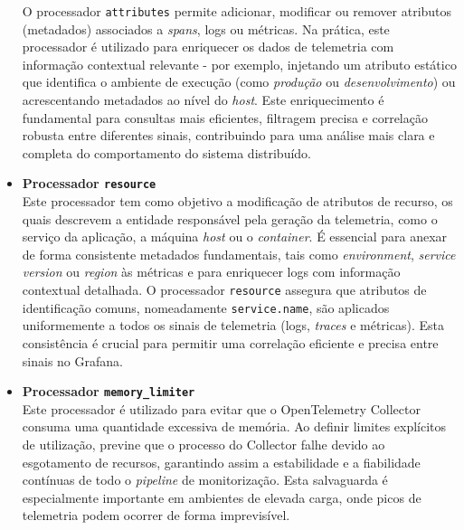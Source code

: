 \begin{itemize}
O processador \texttt{attributes} permite adicionar, modificar ou remover atributos (metadados) associados a \textit{spans}, logs ou métricas. Na prática, este processador é utilizado para enriquecer os dados de telemetria com informação contextual relevante - por exemplo, injetando um atributo estático que identifica o ambiente de execução (como \textit{produção} ou \textit{desenvolvimento}) ou acrescentando metadados ao nível do \textit{host}. Este enriquecimento é fundamental para consultas mais eficientes, filtragem precisa e correlação robusta entre diferentes sinais, contribuindo para uma análise mais clara e completa do comportamento do sistema distribuído.

\item \textbf{Processador \texttt{resource}}\\


Este processador tem como objetivo a modificação de atributos de recurso, os quais descrevem a entidade responsável pela geração da telemetria, como o serviço da aplicação, a máquina \textit{host} ou o \textit{container}. É essencial para anexar de forma consistente metadados fundamentais, tais como \textit{environment}, \textit{service version} ou \textit{region} às métricas e para enriquecer logs com informação contextual detalhada. O processador \texttt{resource} assegura que atributos de identificação comuns, nomeadamente \texttt{service.name}, são aplicados uniformemente a todos os sinais de telemetria (logs, \textit{traces} e métricas). Esta consistência é crucial para permitir uma correlação eficiente e precisa entre sinais no Grafana.

\item \textbf{Processador \texttt{memory\_limiter}}\\

Este processador é utilizado para evitar que o OpenTelemetry Collector consuma uma quantidade excessiva de memória. Ao definir limites explícitos de utilização, previne que o processo do Collector falhe devido ao esgotamento de recursos, garantindo assim a estabilidade e a fiabilidade contínuas de todo o \textit{pipeline} de monitorização. Esta salvaguarda é especialmente importante em ambientes de elevada carga, onde picos de telemetria podem ocorrer de forma imprevisível.



\end{itemize}
